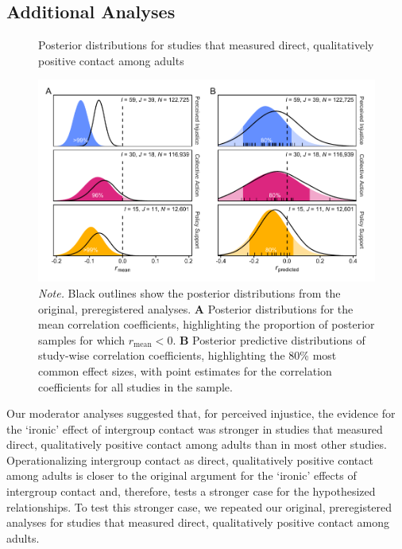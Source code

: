 \documentclass[12pt, letterpaper]{article}
\begin{document}
\hypertarget{additional-analyses}{%
\subsection{Additional Analyses}\label{additional-analyses}}

\begin{figure}[t!]
\centering
\caption{Posterior distributions for studies that measured direct, qualitatively positive contact among adults}
\includegraphics[scale=1]{../figures/figure-8}
\caption*{\textit{Note.} Black outlines show the posterior distributions from the original, preregistered analyses. \textbf{A} Posterior distributions for the mean correlation coefficients, highlighting the proportion of posterior samples for which $r_\text{mean} < 0$. \textbf{B} Posterior predictive distributions of study-wise correlation coefficients, highlighting the 80\% most common effect sizes, with point estimates for the correlation coefficients for all studies in the sample.}
\label{fig:f8}
\end{figure}

Our moderator analyses suggested that, for perceived injustice, the
evidence for the `ironic' effect of intergroup contact was stronger in
studies that measured direct, qualitatively positive contact among
adults than in most other studies. Operationalizing intergroup contact
as direct, qualitatively positive contact among adults is closer to the
original argument for the `ironic' effects of intergroup contact and,
therefore, tests a stronger case for the hypothesized relationships. To
test this stronger case, we repeated our original, preregistered
analyses for studies that measured direct, qualitatively positive
contact among adults.
\end{document}
